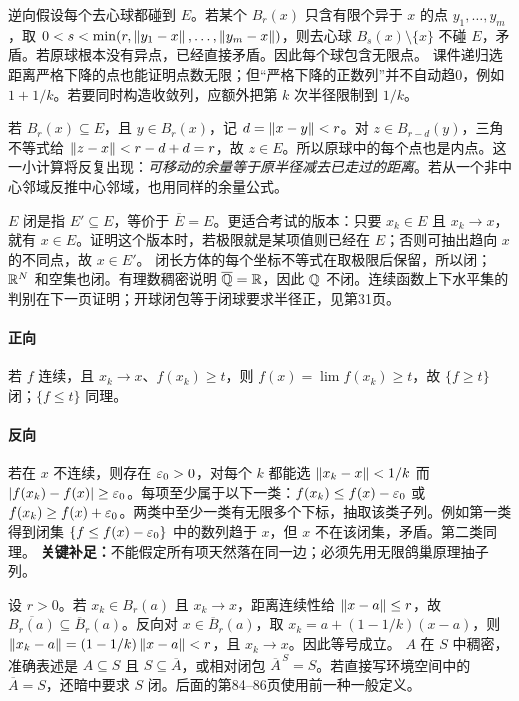 逆向假设每个去心球都碰到 $E$。若某个 $B_r(x)$ 只含有限个异于 $x$ 的点 $y_1,\ldots,y_m$，取
$0<s<\min(r,\left\lVert y_1-x\right\rVert,\ldots,\left\lVert y_m-x\right\rVert)$，则去心球 $B_s(x)\setminus\{x\}$ 不碰 $E$，矛盾。若原球根本没有异点，已经直接矛盾。因此每个球包含无限点。
课件递归选距离严格下降的点也能证明点数无限；但``严格下降的正数列''并不自动趋0，例如 $1+1/k$。若要同时构造收敛列，应额外把第 $k$ 次半径限制到 $1/k$。

若 $B_r(x)\subseteq E$，且 $y\in B_r(x)$，记 $d=\left\lVert x-y\right\rVert<r$。对 $z\in B_{r-d}(y)$，三角不等式给 $\left\lVert z-x\right\rVert<r-d+d=r$，故 $z\in E$。所以原球中的每个点也是内点。这一小计算将反复出现：\emph{可移动的余量等于原半径减去已走过的距离}。若从一个非中心邻域反推中心邻域，也用同样的余量公式。

$E$ 闭是指 $E'\subseteq E$，等价于 $\overline E=E$。更适合考试的版本：只要 $x_k\in E$ 且 $x_k\to x$，就有 $x\in E$。证明这个版本时，若极限就是某项值则已经在 $E$；否则可抽出趋向 $x$ 的不同点，故 $x\in E'$。
闭长方体的每个坐标不等式在取极限后保留，所以闭；$\mathbb{R}^N$ 和空集也闭。有理数稠密说明 $\overline{\mathbb{Q}}=\mathbb{R}$，因此 $\mathbb{Q}$ 不闭。连续函数上下水平集的判别在下一页证明；开球闭包等于闭球要求半径正，见第31页。

\paragraph{正向}若 $f$ 连续，且 $x_k\to x$、$f(x_k)\ge t$，则 $f(x)=\lim f(x_k)\ge t$，故 $\{f\ge t\}$ 闭；$\{f\le t\}$ 同理。
\paragraph{反向}若在 $x$ 不连续，则存在 $\varepsilon_0>0$，对每个 $k$ 都能选 $\left\lVert x_k-x\right\rVert<1/k$ 而 $|f(x_k)-f(x)|\ge\varepsilon_0$。每项至少属于以下一类：$f(x_k)\le f(x)-\varepsilon_0$ 或 $f(x_k)\ge f(x)+\varepsilon_0$。两类中至少一类有无限多个下标，抽取该类子列。例如第一类得到闭集 $\{f\le f(x)-\varepsilon_0\}$ 中的数列趋于 $x$，但 $x$ 不在该闭集，矛盾。第二类同理。
\textbf{关键补足：}不能假定所有项天然落在同一边；必须先用无限鸽巢原理抽子列。

设 $r>0$。若 $x_k\in B_r(a)$ 且 $x_k\to x$，距离连续性给 $\left\lVert x-a\right\rVert\le r$，故 $\overline{B_r(a)}\subseteq\overline B_r(a)$。反向对 $x\in\overline B_r(a)$，取 $x_k=a+(1-1/k)(x-a)$，则 $\left\lVert x_k-a\right\rVert=(1-1/k)\left\lVert x-a\right\rVert<r$，且 $x_k\to x$。因此等号成立。
$A$ 在 $S$ 中稠密，准确表述是 $A\subseteq S$ 且 $S\subseteq\overline A$，或相对闭包 $\overline A^{\,S}=S$。若直接写环境空间中的 $\overline A=S$，还暗中要求 $S$ 闭。后面的第84--86页使用前一种一般定义。

